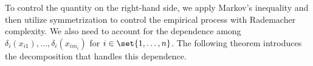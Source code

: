 \documentclass[twoside,11pt]{article}
\begin{document}





To control the quantity on the right-hand side, we apply Markov's inequality and then utilize symmetrization to control the empirical process with Rademacher complexity. We also need to account for the dependence among $\delta_i(x_{i1}), \dots, \delta_i(x_{im_i})$ for $i \in \set{1,\dots, n}$. The following theorem introduces the decomposition that handles this dependence.
\end{document}
